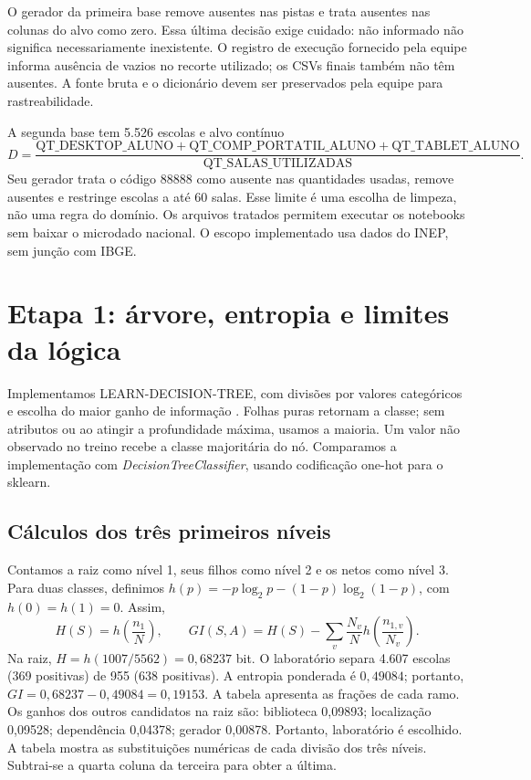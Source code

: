 \documentclass[10pt,a4paper]{article}
\begin{document}
O gerador da primeira base remove ausentes nas pistas e trata ausentes nas colunas do alvo como zero. Essa última decisão exige cuidado: não informado não significa necessariamente inexistente. O registro de execução fornecido pela equipe informa ausência de vazios no recorte utilizado; os CSVs finais também não têm ausentes. A fonte bruta e o dicionário devem ser preservados pela equipe para rastreabilidade.

A segunda base tem 5.526 escolas e alvo contínuo
\[
D=\frac{\text{QT\_DESKTOP\_ALUNO}+\text{QT\_COMP\_PORTATIL\_ALUNO}+\text{QT\_TABLET\_ALUNO}}{\text{QT\_SALAS\_UTILIZADAS}}.
\]
Seu gerador trata o código 88888 como ausente nas quantidades usadas, remove ausentes e restringe escolas a até 60 salas. Esse limite é uma escolha de limpeza, não uma regra do domínio. Os arquivos tratados permitem executar os notebooks sem baixar o microdado nacional. O escopo implementado usa dados do INEP, sem junção com IBGE.

\newpage
\section{Etapa 1: árvore, entropia e limites da lógica}
Implementamos LEARN-DECISION-TREE, com divisões por valores categóricos e escolha do maior ganho de informação \cite{russell}. Folhas puras retornam a classe; sem atributos ou ao atingir a profundidade máxima, usamos a maioria. Um valor não observado no treino recebe a classe majoritária do nó. Comparamos a implementação com \emph{DecisionTreeClassifier}, usando codificação one-hot para o sklearn.

\subsection{Cálculos dos três primeiros níveis}
Contamos a raiz como nível 1, seus filhos como nível 2 e os netos como nível 3. Para duas classes, definimos $h(p)=-p\log_2p-(1-p)\log_2(1-p)$, com $h(0)=h(1)=0$. Assim,
\[
H(S)=h\!\left(\frac{n_1}{N}\right),\qquad
GI(S,A)=H(S)-\sum_v\frac{N_v}{N}h\!\left(\frac{n_{1,v}}{N_v}\right).
\]
Na raiz, $H=h(1007/5562)=0,68237$ bit. O laboratório separa 4.607 escolas (369 positivas) de 955 (638 positivas). A entropia ponderada é $0,49084$; portanto, $GI=0,68237-0,49084=0,19153$. A tabela apresenta as frações de cada ramo.
Os ganhos dos outros candidatos na raiz são: biblioteca 0,09893; localização 0,09528; dependência 0,04378; gerador 0,00878. Portanto, laboratório é escolhido. A tabela mostra as substituições numéricas de cada divisão dos três níveis. Subtrai-se a quarta coluna da terceira para obter a última.
\end{document}
